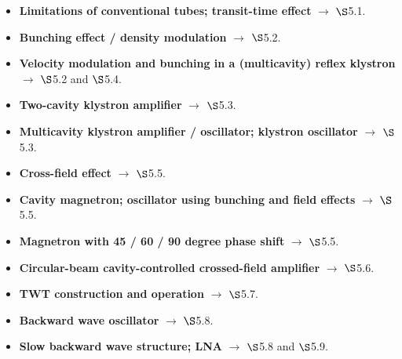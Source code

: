 
\begin{itemize}
  \item \textbf{Limitations of conventional tubes; transit-time effect} $\rightarrow$
    $\S$5.1. 
  \item \textbf{Bunching effect / density modulation} $\rightarrow$ $\S$5.2.
     
  \item \textbf{Velocity modulation and bunching in a (multicavity) reflex klystron}
    $\rightarrow$ $\S$5.2 and $\S$5.4. 
  \item \textbf{Two-cavity klystron amplifier} $\rightarrow$ $\S$5.3. 
  \item \textbf{Multicavity klystron amplifier / oscillator; klystron oscillator}
    $\rightarrow$ $\S$5.3. 
  \item \textbf{Cross-field effect} $\rightarrow$ $\S$5.5. 
  \item \textbf{Cavity magnetron; oscillator using bunching and field effects}
    $\rightarrow$ $\S$5.5. 
  \item \textbf{Magnetron with 45 / 60 / 90 degree phase shift} $\rightarrow$ $\S$5.5.
  \item \textbf{Circular-beam cavity-controlled crossed-field amplifier} $\rightarrow$
    $\S$5.6. 
  \item \textbf{TWT construction and operation} $\rightarrow$ $\S$5.7.
  \item \textbf{Backward wave oscillator} $\rightarrow$ $\S$5.8. 
  \item \textbf{Slow backward wave structure; LNA} $\rightarrow$ $\S$5.8 and $\S$5.9.
\end{itemize}

